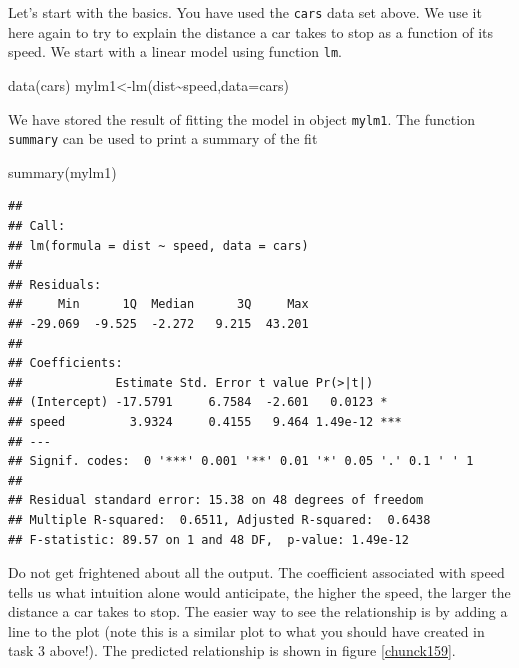 \documentclass[
]{article}
\newenvironment{Shaded}{\begin{snugshade}}{\end{snugshade}}
\newcommand{\AttributeTok}[1]{\textcolor[rgb]{0.77,0.63,0.00}{#1}}
\newcommand{\DecValTok}[1]{\textcolor[rgb]{0.00,0.00,0.81}{#1}}
\newcommand{\FunctionTok}[1]{\textcolor[rgb]{0.00,0.00,0.00}{#1}}
\newcommand{\NormalTok}[1]{#1}
\newcommand{\OtherTok}[1]{\textcolor[rgb]{0.56,0.35,0.01}{#1}}
\newcommand{\SpecialCharTok}[1]{\textcolor[rgb]{0.00,0.00,0.00}{#1}}
\newcommand{\StringTok}[1]{\textcolor[rgb]{0.31,0.60,0.02}{#1}}
\begin{document}
Let's start with the basics. You have used the \texttt{cars} data set
above. We use it here again to try to explain the distance a car takes
to stop as a function of its speed. We start with a linear model using
function \texttt{lm}.

\begin{Shaded}
\begin{Highlighting}[]
\FunctionTok{data}\NormalTok{(cars)}
\NormalTok{mylm1}\OtherTok{\textless{}{-}}\FunctionTok{lm}\NormalTok{(dist}\SpecialCharTok{\textasciitilde{}}\NormalTok{speed,}\AttributeTok{data=}\NormalTok{cars)}
\end{Highlighting}
\end{Shaded}

We have stored the result of fitting the model in object \texttt{mylm1}.
The function \texttt{summary} can be used to print a summary of the fit

\begin{Shaded}
\begin{Highlighting}[]
\FunctionTok{summary}\NormalTok{(mylm1)}
\end{Highlighting}
\end{Shaded}

\begin{verbatim}
## 
## Call:
## lm(formula = dist ~ speed, data = cars)
## 
## Residuals:
##     Min      1Q  Median      3Q     Max 
## -29.069  -9.525  -2.272   9.215  43.201 
## 
## Coefficients:
##             Estimate Std. Error t value Pr(>|t|)    
## (Intercept) -17.5791     6.7584  -2.601   0.0123 *  
## speed         3.9324     0.4155   9.464 1.49e-12 ***
## ---
## Signif. codes:  0 '***' 0.001 '**' 0.01 '*' 0.05 '.' 0.1 ' ' 1
## 
## Residual standard error: 15.38 on 48 degrees of freedom
## Multiple R-squared:  0.6511, Adjusted R-squared:  0.6438 
## F-statistic: 89.57 on 1 and 48 DF,  p-value: 1.49e-12
\end{verbatim}

Do not get frightened about all the output. The coefficient associated
with speed tells us what intuition alone would anticipate, the higher
the speed, the larger the distance a car takes to stop. The easier way
to see the relationship is by adding a line to the plot (note this is a
similar plot to what you should have created in task 3 above!). The
predicted relationship is shown in figure \ref{chunck159}.

\begin{Shaded}
\end{Shaded}
\end{document}
